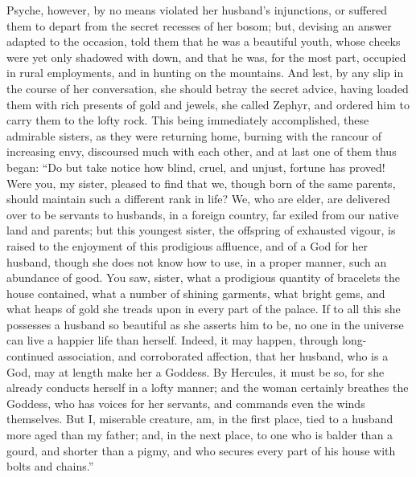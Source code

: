 \documentclass[12pt]{article}
\begin{document}
Psyche, however, by no means violated her husband's injunctions, or suffered
them to depart from the secret recesses of her bosom; but, devising an answer
adapted to the occasion, told them that he was a beautiful youth, whose cheeks
were yet only shadowed with down, and that he was, for the most part, occupied
in rural employments, and in hunting on the mountains. And lest, by any slip in
the course of her conversation, she should betray the secret advice, having
loaded them with rich presents of gold and jewels, she called Zephyr, and
ordered him to carry them to the lofty rock. This being immediately
accomplished, these admirable sisters, as they were returning home, burning
with the rancour of increasing envy, discoursed much with each other, and at
last one of them thus began: ``Do but take notice how blind, cruel, and unjust,
fortune has proved! Were you, my sister, pleased to find that we, though born
of the same parents, should maintain such a different rank in life? We, who are
elder, are delivered over to be servants to husbands, in a foreign country, far
exiled from our native land and parents; but this youngest sister, the
offspring of exhausted vigour, is raised to the enjoyment of this prodigious
affluence, and of a God for her husband, though she does not know how to use,
in a proper manner, such an abundance of good. You saw, sister, what a
prodigious quantity of bracelets the house contained, what a number of shining
garments, what bright gems, and what heaps of gold she treads upon in every
part of the palace. If to all this she possesses a husband so beautiful as she
asserts him to be, no one in the universe can live a happier life than herself.
Indeed, it may happen, through long-continued association, and corroborated
affection, that her husband, who is a God, may at length make her a Goddess. By
Hercules, it must be so, for she already conducts herself in a lofty manner;
and the woman certainly breathes the Goddess, who has voices for her servants,
and commands even the winds themselves. But I, miserable creature, am, in the
first place, tied to a husband more aged than my father; and, in the next
place, to one who is balder than a gourd, and shorter than a pigmy, and who
secures every part of his house with bolts and chains.''
\end{document}
